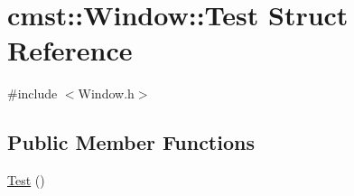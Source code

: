 \hypertarget{structcmst_1_1_window_1_1_test}{}\section{cmst\+:\+:Window\+:\+:Test Struct Reference}
\label{structcmst_1_1_window_1_1_test}


{\ttfamily \#include $<$Window.\+h$>$}

\subsection*{Public Member Functions}
\begin{DoxyCompactItemize}
\item 
\hyperlink{structcmst_1_1_window_1_1_test_af1e9b5fcdbaa7d5ba758571e06e41952}{Test} ()
\end{DoxyCompactItemize}
